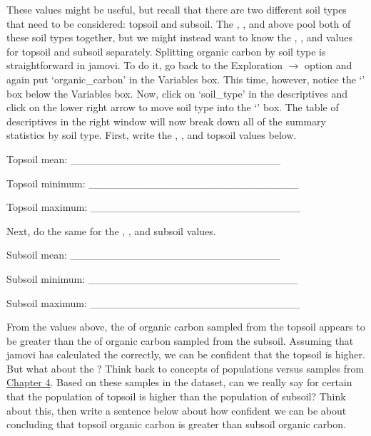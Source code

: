 \documentclass[
  openany]{krantz}
\begin{document}
These values might be useful, but recall that there are two different soil types that need to be considered: topsoil and subsoil.
The , , and  above pool both of these soil types together, but we might instead want to know the , , and  values for topsoil and subsoil separately.
Splitting organic carbon by soil type is straightforward in jamovi.
To do it, go back to the Exploration \(\to\)  option and again put `organic\_carbon' in the Variables box.
This time, however, notice the `' box below the Variables box.
Now, click on `soil\_type' in the descriptives and click on the lower right arrow to move soil type into the `' box.
The table of descriptives in the right window will now break down all of the summary statistics by soil type.
First, write the , , and  topsoil values below.

Topsoil mean: \_\_\_\_\_\_\_\_\_\_\_\_\_\_\_\_\_\_\_\_\_\_\_\_\_\_\_\_

Topsoil minimum: \_\_\_\_\_\_\_\_\_\_\_\_\_\_\_\_\_\_\_\_\_\_\_\_\_\_\_\_

Topsoil maximum: \_\_\_\_\_\_\_\_\_\_\_\_\_\_\_\_\_\_\_\_\_\_\_\_\_\_\_\_

Next, do the same for the , , and  subsoil values.

Subsoil mean: \_\_\_\_\_\_\_\_\_\_\_\_\_\_\_\_\_\_\_\_\_\_\_\_\_\_\_\_

Subsoil minimum: \_\_\_\_\_\_\_\_\_\_\_\_\_\_\_\_\_\_\_\_\_\_\_\_\_\_\_\_

Subsoil maximum: \_\_\_\_\_\_\_\_\_\_\_\_\_\_\_\_\_\_\_\_\_\_\_\_\_\_\_\_

From the values above, the  of organic carbon sampled from the topsoil appears to be greater than the  of organic carbon sampled from the subsoil.
Assuming that jamovi has calculated the  correctly, we can be confident that the topsoil \emph{}  is higher.
But what about the \emph{} ?
Think back to concepts of populations versus samples from \protect\hyperlink{Chapter_4}{Chapter 4}.
Based on these samples in the dataset, can we really say for certain that the population  of topsoil is higher than the population  of subsoil?
Think about this, then write a sentence below about how confident we can be about concluding that topsoil organic carbon is greater than subsoil organic carbon.
\end{document}
